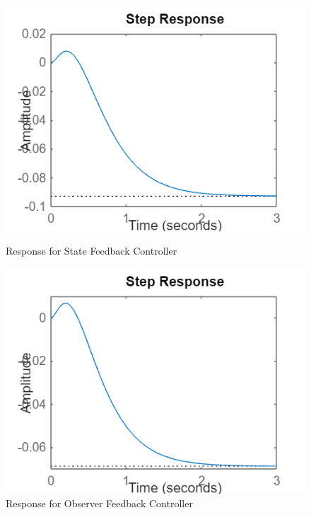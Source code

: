 \documentclass[a4paper,12pt]{article}
\begin{document}
\begin{figure}[h!]
    \centering
    \begin{minipage}{0.45\textwidth}
        \centering
        \includegraphics[width=\textwidth]{state_feedback.png}
        \caption{Response for State Feedback Controller}
    
    \end{minipage}
    \hfill
    \begin{minipage}{0.45\textwidth}
        \centering
        \includegraphics[width=\textwidth]{observer_feedback.png}
        \caption{Response for Observer Feedback Controller}
    \end{minipage}
\end{figure}
\end{document}
